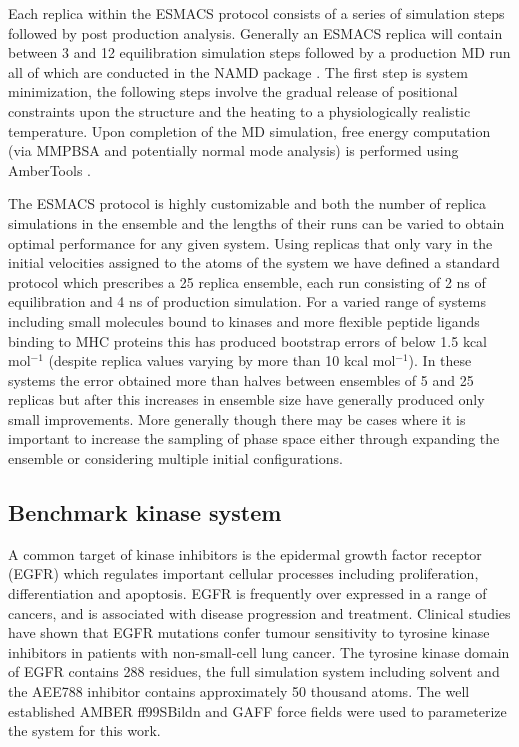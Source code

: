 Each replica within the ESMACS protocol consists of a series of simulation
steps followed by post production analysis. Generally an ESMACS replica will
contain between 3 and 12 equilibration simulation steps followed by a
production MD run all of which are conducted in the NAMD package
\cite{Phillips2005}. The first step is system minimization, the following
steps involve the gradual release of positional constraints upon the structure
and the heating to a physiologically realistic temperature. Upon completion of
the MD simulation, free energy computation (via MMPBSA and potentially normal
mode analysis) is performed using AmberTools \cite{amber14, Case2005,
MillerIII2012}.

The ESMACS protocol is highly customizable and both the number of replica 
simulations in the ensemble and the lengths of their runs can be varied to obtain 
optimal performance for any given system.
Using replicas that only vary in the initial velocities assigned to the atoms of 
the system we have defined a standard protocol which prescribes a 25 replica ensemble, 
each run consisting of 2 ns of equilibration and 4 ns of production simulation.
For a varied range of systems including small molecules bound to kinases and
more flexible peptide ligands binding to MHC proteins this has produced bootstrap 
errors of below 1.5 kcal mol$^{-1}$ (despite replica values varying by more than 10 
kcal mol$^{-1}$). \cite{Wan2015, Wright2014, Wan2017brd4}
In these systems the error obtained more than halves between ensembles of 5 and 25 
replicas but after this increases in ensemble size have generally produced only small 
improvements.
More generally though there may be cases where it is important to 
increase the sampling of phase space either through expanding the ensemble or considering 
multiple initial configurations.

\subsection{Benchmark kinase system}

A common target of kinase inhibitors is the epidermal growth factor receptor (EGFR) which regulates important cellular processes including proliferation, differentiation and apoptosis.
EGFR is frequently over expressed in a range of cancers, and is associated with disease progression and treatment. 
Clinical studies have shown that EGFR mutations confer tumour sensitivity to tyrosine kinase inhibitors in patients with non-small-cell lung cancer.
The tyrosine kinase domain of EGFR contains 288 residues, the full simulation system including solvent and the AEE788 inhibitor contains approximately 50 thousand atoms.
The well established AMBER ff99SBildn and GAFF force fields \cite{Maier2015, Wang2004} were used to parameterize the system for this work.
